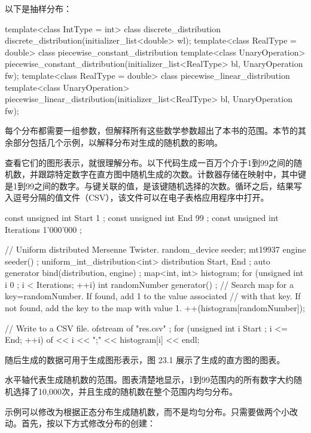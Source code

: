 以下是抽样分布：

\begin{cpp}
template<class IntType = int> class discrete_distribution
    discrete_distribution(initializer_list<double> wl);
template<class RealType = double> class piecewise_constant_distribution
    template<class UnaryOperation>
        piecewise_constant_distribution(initializer_list<RealType> bl,
            UnaryOperation fw);
template<class RealType = double> class piecewise_linear_distribution
    template<class UnaryOperation>
        piecewise_linear_distribution(initializer_list<RealType> bl,
            UnaryOperation fw);
\end{cpp}

每个分布都需要一组参数，但解释所有这些数学参数超出了本书的范围。本节的其余部分包括几个示例，以解释分布对生成的随机数的影响。

查看它们的图形表示，就很理解分布。以下代码生成一百万个介于1到99之间的随机数，并跟踪特定数字在直方图中随机生成的次数。计数器存储在映射中，其中键是1到99之间的数字。与键关联的值，是该键随机选择的次数。循环之后，结果写入逗号分隔的值文件（CSV），该文件可以在电子表格应用程序中打开。

\begin{cpp}
const unsigned int Start { 1 };
const unsigned int End { 99 };
const unsigned int Iterations { 1'000'000 };

// Uniform distributed Mersenne Twister.
random_device seeder;
mt19937 engine { seeder() };
uniform_int_distribution<int> distribution { Start, End };
auto generator { bind(distribution, engine) };
map<int, int> histogram;
for (unsigned int i { 0 }; i < Iterations; ++i) {
    int randomNumber { generator() };
    // Search map for a key=randomNumber. If found, add 1 to the value associated
    // with that key. If not found, add the key to the map with value 1.
    ++(histogram[randomNumber]);
}

// Write to a CSV file.
ofstream of { "res.csv" };
for (unsigned int i { Start }; i <= End; ++i) {
    of << i << ";" << histogram[i] << endl;
}
\end{cpp}

随后生成的数据可用于生成图形表示，图 23.1 展示了生成的直方图的图表。

水平轴代表生成随机数的范围。图表清楚地显示，1到99范围内的所有数字大约随机选择了10,000次，并且生成的随机数在整个范围内均匀分布。


示例可以修改为根据正态分布生成随机数，而不是均匀分布。只需要做两个小改动。首先，按以下方式修改分布的创建：

